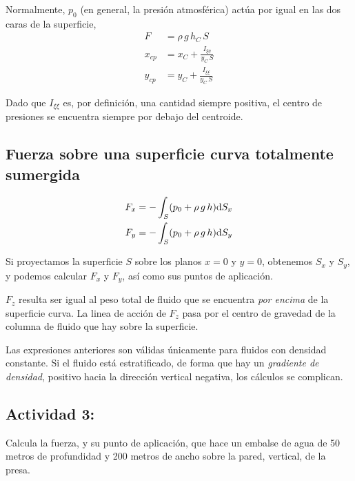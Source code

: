 Normalmente, $p_{0}$ (en general, la presión atmosférica) actúa por
igual en las dos caras de la superficie, 
\begin{align*}
F & =\rho\,g\,h_{C}\,S\\
x_{cp} & =x_{C}+\frac{I_{\xi\eta}}{y_{C}\,S}\\
y_{cp} & =y_{C}+\frac{I_{\xi\xi}}{y_{C}\,S}
\end{align*}

Dado que $I_{\xi\xi}$ es, por definición, una cantidad siempre positiva,
el centro de presiones se encuentra siempre por debajo del centroide.


\subsection{Fuerza sobre una superficie curva totalmente sumergida}


\begin{center}
\resizebox{!}{5cm}{}
\par\end{center}

 
\[
\begin{aligned}F_{x} & =-\int_{S}(p_{0}+\rho\,g\,h)\text{d} S_{x}\\
F_{y} & =-\int_{S}(p_{0}+\rho\,g\,h)\text{d} S_{y}
\end{aligned}
\]
 

Si proyectamos la superficie $S$ sobre los planos $x=0$ y $y=0$,
obtenemos $S_{x}$ y $S_{y}$, y podemos calcular $F_{x}$ y $F_{y}$,
así como sus puntos de aplicación.

$F_{z}$ resulta ser igual al peso total de fluido que se encuentra
\emph{por encima} de la superficie curva. La linea de acción de $F_{z}$
pasa por el centro de gravedad de la columna de fluido que hay sobre
la superficie.

Las expresiones anteriores son válidas únicamente para fluidos con
densidad constante. Si el fluido está estratificado, de forma que
hay un \textit{gradiente de densidad}, positivo hacia la dirección
vertical negativa, los cálculos se complican.


\subsection*{Actividad 3:}
Calcula la fuerza, y su punto de aplicación, que hace un embalse de agua de 50
metros de profundidad y 200 metros de ancho sobre la pared, vertical,
de la presa.


